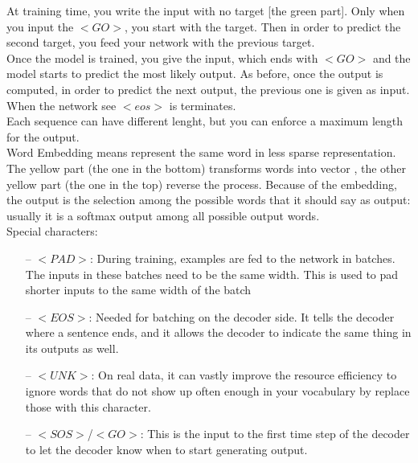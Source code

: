 
At training time, you write the input with no target [the green part]. Only when you input the $<GO>$, you start with the target. Then in order to predict the second target, you feed your network with the previous target.\\
Once the model is trained, you give the input, which ends with $<GO>$ and the model starts to predict the most likely output. As before, once the output is computed, in order to predict the next output, the previous one is given as input. When the network see $<eos>$ is terminates. \\
Each sequence can have different lenght, but you can enforce a maximum length for the output. 
\\
Word Embedding means represent the same word in less sparse representation. The yellow part (the one in the bottom) transforms words into vector , the other yellow part (the one in the top) reverse the process. 
Because of the embedding, the output is the selection among the possible words that it should say as output: usually it is a softmax output among all possible output words. \\

Special characters:
\begin{itemize}
    \item[--]$<PAD>$: During training, examples are fed to the network in batches. The inputs in these batches need to be the same width. This is used to pad shorter inputs to the same width of the batch
    \item[--]$<EOS>$: Needed for batching on the decoder side. It tells the decoder where a sentence ends, and it allows the decoder to indicate the same thing in its outputs as well.
    \item[--]$<UNK>$: On real data, it can vastly improve the resource efficiency to ignore words that do not show up often enough in your vocabulary by replace those with this character.
    \item[--]$<SOS>$/$<GO>$: This is the input to the first time step of the decoder to let the decoder know when to start generating output.
\end{itemize}

